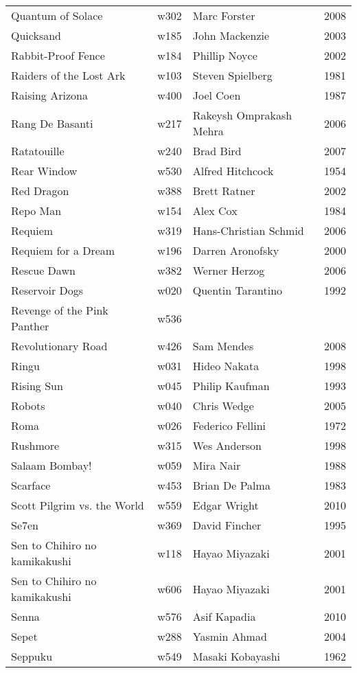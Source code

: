 \documentclass{article}
\begin{document}
\begin {center}
\begin{longtable}{p{10cm} l l l}
Quantum of Solace & w302 & Marc Forster & 2008 \\
Quicksand & w185 & John Mackenzie & 2003 \\
Rabbit-Proof Fence & w184 & Phillip Noyce & 2002 \\
Raiders of the Lost Ark & w103 & Steven Spielberg & 1981 \\
Raising Arizona & w400 & Joel Coen & 1987 \\
Rang De Basanti & w217 & Rakeysh Omprakash Mehra & 2006 \\
Ratatouille & w240 & Brad Bird & 2007 \\
Rear Window & w530 & Alfred Hitchcock & 1954 \\
Red Dragon & w388 & Brett Ratner & 2002 \\
Repo Man & w154 & Alex Cox & 1984 \\
Requiem & w319 & Hans-Christian Schmid & 2006 \\
Requiem for a Dream & w196 & Darren Aronofsky & 2000 \\
Rescue Dawn & w382 & Werner Herzog & 2006 \\
Reservoir Dogs & w020 & Quentin Tarantino & 1992 \\
Revenge of the Pink Panther & w536 &  &  \\
Revolutionary Road & w426 & Sam Mendes & 2008 \\
Ringu & w031 & Hideo Nakata & 1998 \\
Rising Sun & w045 & Philip Kaufman & 1993 \\
Robots & w040 & Chris Wedge & 2005 \\
Roma & w026 & Federico Fellini & 1972 \\
Rushmore & w315 & Wes Anderson & 1998 \\
Salaam Bombay! & w059 & Mira Nair & 1988 \\
Scarface & w453 & Brian De Palma & 1983 \\
Scott Pilgrim vs. the World & w559 & Edgar Wright & 2010 \\
Se7en & w369 & David Fincher & 1995 \\
Sen to Chihiro no kamikakushi & w118 & Hayao Miyazaki & 2001 \\
Sen to Chihiro no kamikakushi & w606 & Hayao Miyazaki & 2001 \\
Senna & w576 & Asif Kapadia & 2010 \\
Sepet & w288 & Yasmin Ahmad & 2004 \\
Seppuku & w549 & Masaki Kobayashi & 1962 \\

\end{longtable}
\end{center}
\end{document}
